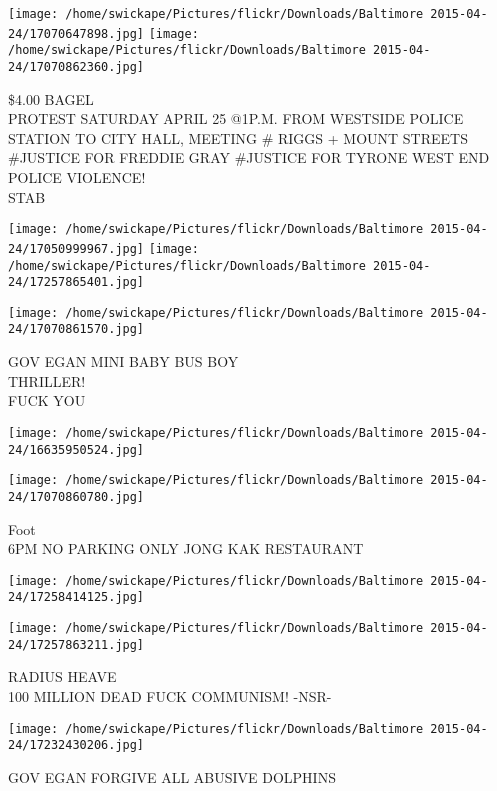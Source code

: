 \documentclass[10pt,letterpaper]{article}
\begin{document}
\texttt{[image: /home/swickape/Pictures/flickr/Downloads/Baltimore 2015-04-24/17070647898.jpg]}
\texttt{[image: /home/swickape/Pictures/flickr/Downloads/Baltimore 2015-04-24/17070862360.jpg]}

\$4.00 BAGEL\\
PROTEST SATURDAY APRIL 25 @1P.M. FROM WESTSIDE POLICE STATION TO CITY HALL, MEETING \# RIGGS + MOUNT STREETS\\
\#JUSTICE FOR FREDDIE GRAY \#JUSTICE FOR TYRONE WEST END POLICE VIOLENCE!\\
STAB\\
\pagebreak

\texttt{[image: /home/swickape/Pictures/flickr/Downloads/Baltimore 2015-04-24/17050999967.jpg]}
\texttt{[image: /home/swickape/Pictures/flickr/Downloads/Baltimore 2015-04-24/17257865401.jpg]}

\texttt{[image: /home/swickape/Pictures/flickr/Downloads/Baltimore 2015-04-24/17070861570.jpg]}

GOV EGAN MINI BABY BUS BOY\\
THRILLER!\\
FUCK YOU\\
\pagebreak

\texttt{[image: /home/swickape/Pictures/flickr/Downloads/Baltimore 2015-04-24/16635950524.jpg]}

\vspace{0.25in}
\texttt{[image: /home/swickape/Pictures/flickr/Downloads/Baltimore 2015-04-24/17070860780.jpg]}

Foot\\
6PM NO PARKING ONLY JONG KAK RESTAURANT\\
\pagebreak

\texttt{[image: /home/swickape/Pictures/flickr/Downloads/Baltimore 2015-04-24/17258414125.jpg]}

\vspace{0.25in}
\texttt{[image: /home/swickape/Pictures/flickr/Downloads/Baltimore 2015-04-24/17257863211.jpg]}

RADIUS HEAVE\\
100 MILLION DEAD FUCK COMMUNISM!  {-}NSR{-}\\
\pagebreak

\texttt{[image: /home/swickape/Pictures/flickr/Downloads/Baltimore 2015-04-24/17232430206.jpg]}

GOV EGAN FORGIVE ALL ABUSIVE DOLPHINS\\
\pagebreak
\end{document}
